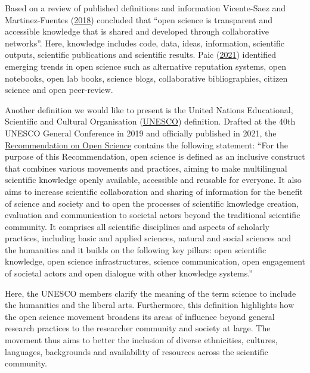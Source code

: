 \documentclass[
]{book}
\begin{document}
Based on a review of published definitions and information Vicente-Saez and Martinez-Fuentes (\href{https://isiarticles.com/bundles/Article/pre/pdf/143111.pdf}{2018}) concluded that ``open science is transparent and accessible knowledge that is shared and developed through collaborative networks''. Here, knowledge includes code, data, ideas, information, scientific outputs, scientific publications and scientific results. Paic (\href{https://goingdigital.oecd.org/data/notes/No13_ToolkitNote_OpenScience.pdf}{2021}) identified emerging trends in open science such as alternative reputation systems, open notebooks, open lab books, science blogs, collaborative bibliographies, citizen science and open peer-review.

Another definition we would like to present is the United Nations Educational, Scientific and Cultural Organisation (\href{https://www.unesco.org/en}{UNESCO}) definition. Drafted at the 40th UNESCO General Conference in 2019 and officially published in 2021, the \href{https://en.unesco.org/science-sustainable-future/open-science/recommendation}{Recommendation on Open Science} contains the following statement: ``For the purpose of this Recommendation, open science is defined as an inclusive construct that combines various movements and practices, aiming to make multilingual scientific knowledge openly available, accessible and reusable for everyone. It also aims to increase scientific collaboration and sharing of information for the benefit of science and society and to open the processes of scientific knowledge creation, evaluation and communication to societal actors beyond the traditional scientific community. It comprises all scientific disciplines and aspects of scholarly practices, including basic and applied sciences, natural and social sciences and the humanities and it builds on the following key pillars: open scientific knowledge, open science infrastructures, science communication, open engagement of societal actors and open dialogue with other knowledge systems.''

Here, the UNESCO members clarify the meaning of the term science to include the humanities and the liberal arts. Furthermore, this definition highlights how the open science movement broadens its areas of influence beyond general research practices to the researcher community and society at large. The movement thus aims to better the inclusion of diverse ethnicities, cultures, languages, backgrounds and availability of resources across the scientific community.
\end{document}
